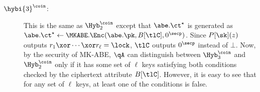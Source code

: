 \begin{description}

\item[$\hybi{3}^\coin$:] This is the same as $\Hyb_2^\coin$ except
that $\abe.\ct^\star$ is generated as $\abe.\ct^\star \gets
\MKABE.\Enc(\abe.\pk, B[\tlC], 0^\secp)$.
Since $P[\sk](z)$ outputs $r_1 \xor \cdots \xor r_\ell = \lock$,
$\tlC$ outputs $0^\secp$ instead of $\bot$. Now, by the
security of MK-ABE, $\qA$ can distinguish between $\Hyb_3^\coin$
and $\Hyb_2^\coin$ only if it has some set of $\ell$ keys satisfying
both conditions checked by the ciphertext attribute $B[\tlC]$.
However, it is easy to see that for any set of $\ell$ keys, at least
one of the conditions is false.

\end{description}